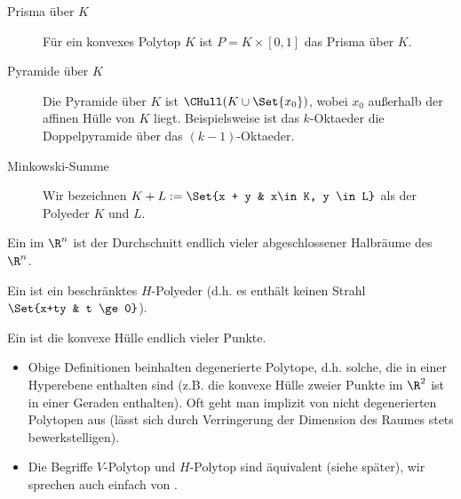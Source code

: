\begin{ex}
\begin{description}
        \item[Prisma über $K$]
            Für ein konvexes Polytop $K$ ist $P = K \times [0,1]$ das Prisma über $K$.

        \item[Pyramide über $K$]
            Die Pyramide über $K$ ist $\CHull(K \cup \Set{x_0})$, wobei $x_0$ außerhalb der affinen Hülle von $K$ liegt.
            Beispielsweise ist das $k$-Oktaeder die Doppelpyramide über das $(k-1)$-Oktaeder.

        \item[Minkowski-Summe]
            Wir bezeichnen
            \begin{math}
                K + L := \Set{x + y & x\in K, y \in L}
            \end{math}
            als  der Polyeder $K$ und $L$.

    \end{description}
\end{ex}


\begin{df}
    Ein  im $\R^n$ ist der Durchschnitt endlich vieler abgeschlossener Halbräume des $\R^n$.

    Ein  ist ein beschränktes $H$-Polyeder (d.h. es enthält keinen Strahl $\Set{x+ty & t \ge 0}$).
\end{df}

\begin{df}[$V$-Polytop]
    Ein  ist die konvexe Hülle endlich vieler Punkte.
\end{df}

\begin{note}
    \begin{itemize}
        \item
            Obige Definitionen beinhalten degenerierte Polytope, d.h. solche, die in einer Hyperebene enthalten sind (z.B. die konvexe Hülle zweier Punkte im $\R^2$ ist in einer Geraden enthalten).
            Oft geht man implizit von nicht degenerierten Polytopen aus (lässt sich durch Verringerung der Dimension des Raumes stets bewerkstelligen).
        \item
            Die Begriffe $V$-Polytop und $H$-Polytop sind äquivalent (siehe später), wir sprechen auch einfach von .
    \end{itemize}
\end{note}

